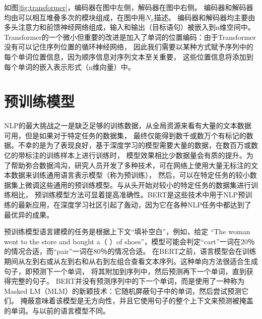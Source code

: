 如图\ref{fig:transformer}，编码器在图中左侧，解码器在图中右侧。 
编码器和解码器均由可以相互堆叠多次的模块组成，在图中用$N_x$描述。 
编码器和解码器均主要由多头注意力和前馈神经网络组成，输入和输出（目标语句）被嵌入到n维空间中。
Transformer的一个微小但重要的改进是加入了单词的位置编码：由于Transformer没有可以记住序列位置的循环神经网络，
因此我们需要以某种方式赋予序列中的每个单词位置信息，因为顺序信息对序列文本至关重要，
这些位置信息将添加到每个单词的嵌入表示形式（n维向量）中。

\section{预训练模型}
NLP的最大挑战之一是缺乏足够的训练数据，从全局资源来看有大量的文本数据可用，但是如果对于特定任务的数据集，
最终仅能得到数千或数万个有标记的数据。不幸的是为了表现良好，基于深度学习的模型需要大量的数据，在数百万或数亿的带标注的训练样本上进行训练时，
模型效果相比少数据量会有质的提升。为了帮助弥合数据鸿沟，研究人员开发了多种技术，可在网络上使用大量无标注的文本数据来训练通用语言表示模型（称为预训练），
然后，可以在特定任务的较小数据集上微调这些通用的预训练模型。与从头开始对较小的特定任务的数据集进行训练相比，
预训练模型方法可显着提高准确性。BERT\cite{devlin2018bert}是这些技术中用于NLP预训练的最新应用，在深度学习社区引起了轰动，因为它在各种NLP任务中都达到了最优异的成果。

预训练模型语言建模的任务是根据上下文“填补空白”\cite{marcelino2018transfer}，例如，给定
“The woman went to the store and bought a（ ）of shoes”，模型可能会判定“cart”一词在20％的情况合适，而“pair”一词在80％的情况合适。
在BERT之前，语言模型会在训练期间从左到右或从左到右和从右到左组合查看文本序列。这种单向方法很适合生成句子，即预测下一个单词，
将其附加到序列中，然后预测再下一个单词，直到获得完整的句子。
BERT并没有预测序列中的下一个单词，而是使用了一种称为Masked LM（MLM）的新颖技术：它随机屏蔽句子中的单词，然后尝试预测它们。
掩蔽意味着该模型是无方向性，并且它使用句子的整个上下文来预测被掩盖的单词。与以前的语言模型不同。


